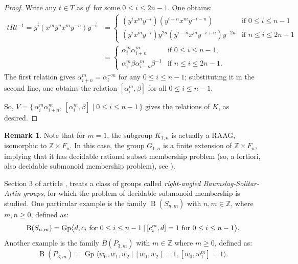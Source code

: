\documentclass{amsart}
\newcommand{\Gpres}[2]{\operatorname{Gp}\bigl\langle #1\:|\:#2 \bigr\rangle}
\newcommand{\Z}{\mathbb{Z}}
\theoremstyle{plain}
\theoremstyle{definition}
\newtheorem{remark}[theorem]{Remark}
\begin{document}
\begin{proof}
Write any $t\in T$ as $y^i$ for some $0 \leq i \leq 2n-1$. One obtains:
\begin{align*}
tRt^{-1} = y^i(x^m y^n x^m y^{-n})y^{-i} & = 
    \begin{cases}
    (y^i x^m y^{-i}) (y^{i + n} x^m y^{-i - n}) & \text{if } 0 \leq i \leq n - 1 \\
    (y^i x^m y^{-i}) y^{2n} (y^{i - n} x^m y^{-i + n}) y^{-2n} & \text{if } n \leq i \leq 2n - 1
\end{cases}
\\
& = 
\begin{cases}
    \alpha_i^m \alpha_{i+n}^m & \text{if } 0 \leq i \leq n - 1, \\
    \alpha_i^m \beta \alpha_{i-n}^m \beta^{-1} & \text{if } n \leq i \leq 2n - 1.
\end{cases}
\end{align*}
The first relation gives $\alpha_{i+n}^m = \alpha_i^{-m}$ for any $0 \leq i \leq n - 1$; substituting it in the second line, one obtains the relation $[\alpha_i^m, \beta]$ for all $0 \leq i \leq n - 1$.

So, $
V = \{\, \alpha_i^m \alpha_{i+n}^m,\, [\alpha_i^m, \beta] \mid 0 \leq i \leq n - 1 \,\}$ gives the relations of $K$, as desired.
\end{proof}

\begin{remark}\label{G_{1,n} finite extension of a RAAG}
Note that for $m=1$, the subgroup $K_{1,n}$ is actually a RAAG, isomorphic to $\Z \times F_n$. In this case, the  group $G_{1,n}$ is a finite extension of $\Z \times F_n$, implying that it has decidable rational subset membership problem (so, a fortiori, also decidable submonoid membership problem), see \cite{Lohrey2008}).
\end{remark}

Section 3 of article \cite{nyberg2022diophantine}, treats a class of groups called {\it right-angled Baumslag-Solitar-Artin groups}, for which the problem of decidable submonoid membership is studied. 
One particular example is the family $\operatorname{B}(S_{n,m})$ with $n,m \in \Z$, where $m,n \geq 0$, defined as:
\begin{equation}\label{B(S_{n,m})}
\operatorname{B}(S_{n,m}) = \Gpres{d, c_i \text{ for $0 \leq i \leq n - 1$}}{[c_i^m, d]=1 \text{ for $0 \leq i \leq n - 1$}}.
\end{equation}
Another example is the family $B(P_{3,m})$ with $m \in \Z$ where $m \geq 0$, defined as:    
\begin{equation}\label{EqP3m}
\operatorname{B}(P_{3,m}) = \Gpres{w_0,w_1,w_2}{[w_0,w_2]=1, [w_0,w_1^m]=1}.
\end{equation}
\end{document}
